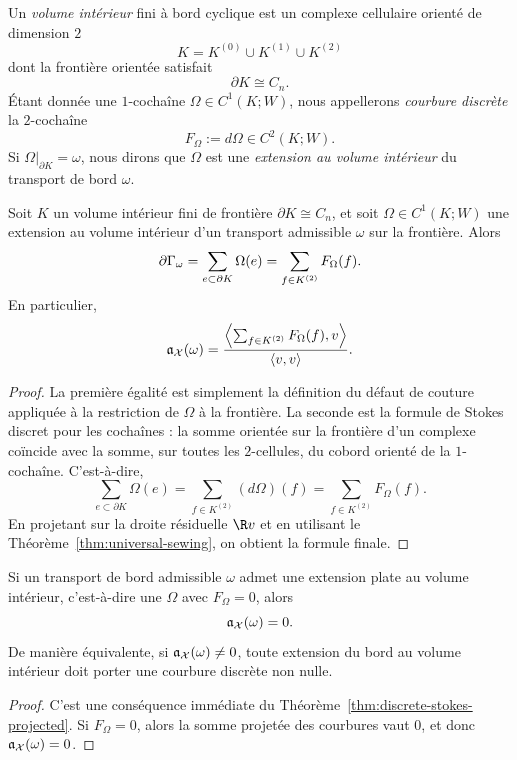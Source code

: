 \begin{definition}
Un \emph{volume intérieur} fini à bord cyclique est un complexe cellulaire orienté de dimension $2$
\[
K=K^{(0)}\cup K^{(1)}\cup K^{(2)}
\]
dont la frontière orientée satisfait
\[
\partial K\cong C_n.
\]
Étant donnée une $1$-cochaîne $\Omega\in C^1(K;W)$, nous appellerons \emph{courbure discrète} la
$2$-cochaîne
\[
F_\Omega:=d\Omega\in C^2(K;W).
\]
Si $\Omega\vert_{\partial K}=\omega$, nous dirons que $\Omega$ est une \emph{extension au volume intérieur} du
transport de bord $\omega$.
\end{definition}

\begin{theorem}\label{thm:discrete-stokes-projected}
Soit $K$ un volume intérieur fini de frontière $\partial K\cong C_n$, et soit $\Omega\in C^1(K;W)$ une
extension au volume intérieur d'un transport admissible $\omega$ sur la frontière. Alors
\[
\partial\Gamma_\omega
=
\sum_{e\subset \partial K}\Omega(e)
=
\sum_{f\in K^{(2)}}F_\Omega(f).
\]
En particulier,
\[
\mathfrak a_\mathcal X(\omega)
=
\frac{\left\langle \sum_{f\in K^{(2)}}F_\Omega(f),v\right\rangle}{\langle v,v\rangle}.
\]
\end{theorem}

\begin{proof}
La première égalité est simplement la définition du défaut de couture appliquée à la restriction de
$\Omega$ à la frontière. La seconde est la formule de Stokes discret pour les cochaînes : la somme orientée
sur la frontière d'un complexe coïncide avec la somme, sur toutes les $2$-cellules, du cobord
orienté de la $1$-cochaîne. C'est-à-dire,
\[
\sum_{e\subset \partial K}\Omega(e)=\sum_{f\in K^{(2)}}(d\Omega)(f)=\sum_{f\in K^{(2)}}F_\Omega(f).
\]
En projetant sur la droite résiduelle $\R v$ et en utilisant le
Théorème~\ref{thm:universal-sewing}, on obtient la formule finale.
\end{proof}

\begin{corollary}\label{cor:no-flat-bulk}
Si un transport de bord admissible $\omega$ admet une extension plate au volume intérieur,
c'est-à-dire une $\Omega$ avec $F_\Omega=0$, alors
\[
\mathfrak a_\mathcal X(\omega)=0.
\]
De manière équivalente, si $\mathfrak a_\mathcal X(\omega)\neq 0$, toute extension du bord au volume intérieur doit porter
une courbure discrète non nulle.
\end{corollary}

\begin{proof}
C'est une conséquence immédiate du Théorème~\ref{thm:discrete-stokes-projected}. Si
$F_\Omega=0$, alors la somme projetée des courbures vaut $0$, et donc
$\mathfrak a_\mathcal X(\omega)=0$.
\end{proof}

